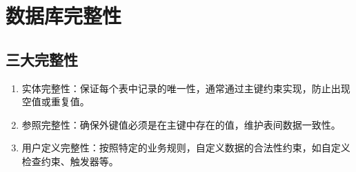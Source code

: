 \section{数据库完整性}
\subsection{三大完整性}
\begin{enumerate}
    \item 实体完整性：保证每个表中记录的唯一性，通常通过主键约束实现，防止出现空值或重复值。
    \item 参照完整性：确保外键值必须是在主键中存在的值，维护表间数据一致性。
    \item 用户定义完整性：按照特定的业务规则，自定义数据的合法性约束，如自定义检查约束、触发器等。
\end{enumerate}